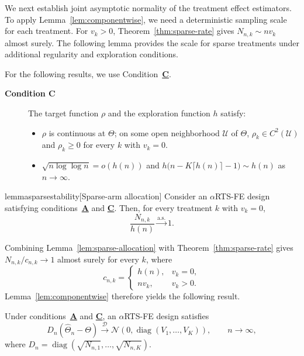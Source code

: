 {\color{revisiongreen}
We next establish joint asymptotic normality of the treatment effect estimators.
To apply Lemma~\ref{lem:componentwise}, we need a deterministic sampling scale
for each treatment. For \(v_k>0\), Theorem~\ref{thm:sparse-rate} gives
\(N_{n,k}\sim nv_k\) almost surely. The following lemma provides the scale
for sparse treatments under additional regularity and exploration conditions.

For the following results, we use Condition~\hyperlink{CC}{\textbf{C}}.
\begin{description}
\item[\hypertarget{CC}{\textbf{Condition C}}] The target function \(\rho\) and the exploration function \(h\) satisfy:
\begin{itemize}
\item \(\rho\) is continuous at \(\Theta\); on some open neighborhood \(\mathcal U\) of \(\Theta\), \(\rho_k\in C^2(\mathcal U)\) and \(\rho_k\geq0\) for every \(k\) with \(v_k=0\).
\item \(\sqrt{n\log\log n}=o(h(n))\) and \(h\bigl(n-K\lceil h(n)\rceil-1\bigr)\sim h(n)\) as \(n\to\infty\).
\end{itemize}
\end{description}

\begin{restatable}{lemma}{sparsestability}[Sparse-arm allocation]
\label{lem:sparse-allocation}
Consider an \(\alpha\)RTS-FE design satisfying conditions~\hyperlink{CA}{\textbf{A}} and \hyperlink{CC}{\textbf{C}}.
Then, for every treatment \(k\) with \(v_k=0\),
\[
\frac{N_{n,k}}{h(n)}\xrightarrow{\mathrm{a.s.}}1.
\]
\end{restatable}

Combining Lemma~\ref{lem:sparse-allocation} with Theorem~\ref{thm:sparse-rate}
gives \(N_{n,k}/c_{n,k}\to1\) almost surely for every \(k\), where
\[
c_{n,k}=\begin{cases}
h(n), & v_k=0,\\
nv_k, & v_k>0.
\end{cases}
\]
Lemma~\ref{lem:componentwise} therefore yields the following result.

\begin{corollary}\label{corr:componentwise}
Under conditions~\hyperlink{CA}{\textbf{A}} and \hyperlink{CC}{\textbf{C}}, an \(\alpha\)RTS-FE design satisfies
\[
D_n(\widehat\Theta_n-\Theta)
\xrightarrow{\mathcal D}
\mathcal N\!\left(0,\operatorname{diag}(V_1,\ldots,V_K)\right),
\qquad n\to\infty,
\]
where \(D_n=\operatorname{diag}(\sqrt{N_{n,1}},\ldots,\sqrt{N_{n,K}})\).
\end{corollary}
}



